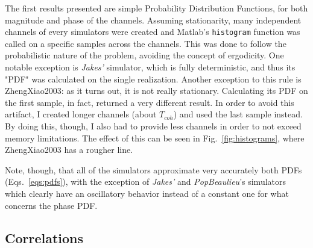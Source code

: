 The first results presented are simple Probability Distribution Functions, for both magnitude and phase of the channels. Assuming stationarity, many independent channels of every simulators were created and Matlab's \texttt{histogram} function was called on a specific samples across the channels. This was done to follow the probabilistic nature of the problem, avoiding the concept of ergodicity. One notable exception is \textit{Jakes'} simulator, which is fully deterministic, and thus its "PDF" was calculated on the single realization. Another exception to this rule is ZhengXiao2003: as it turns out, it is not really stationary. Calculating its PDF on the first sample, in fact, returned a very different result. In order to avoid this artifact, I created longer channels (about $T_{coh}$) and used the last sample instead. By doing this, though, I also had to provide less channels in order to not exceed memory limitations. The effect of this can be seen in Fig.~\ref{fig:histograms}, where ZhengXiao2003 has a rougher line.

Note, though, that all of the simulators approximate very accurately both PDFs (Eqs.~\ref{eqs:pdfs}), with the exception of \textit{Jakes'} and \textit{PopBeaulieu}'s simulators which clearly have an oscillatory behavior instead of a constant one for what concerns the phase PDF.

\subsection{Correlations}

